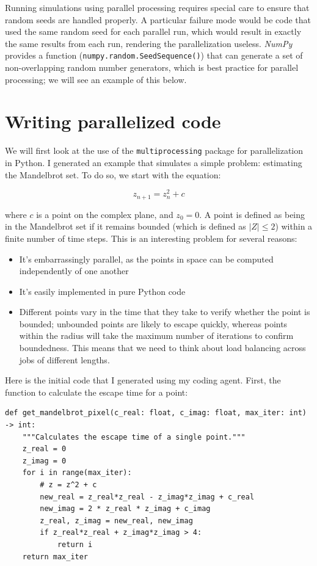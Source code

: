 Running simulations using parallel processing requires special care to ensure that random seeds are handled properly.  A particular failure mode would be code that used the same random seed for each parallel run, which would result in exactly the same results from each run, rendering the parallelization useless.  \textit{NumPy} provides a function (\texttt{numpy.random.SeedSequence()}) that can generate a set of non-overlapping random number generators, which is best practice for parallel processing; we will see an example of this below.

\section{Writing parallelized code}

We will first look at the use of the \texttt{multiprocessing} package for parallelization in Python.  I generated an example that simulates a simple problem: estimating the Mandelbrot set.  To do so, we start with the equation:

\begin{equation}
z_{n+1} = z^2_n + c
\end{equation}

where $c$ is a point on the complex plane, and $z_0 = 0$.  A point is defined as being in the Mandelbrot set if it remains bounded (which is defined as $|Z| \le 2$) within a finite number of time steps.  This is an interesting problem for several reasons:

\begin{itemize}
\item It's embarrassingly parallel, as the points in space can be computed independently of one another
\item It's easily implemented in pure Python code
\item Different points vary in the time that they take to verify whether the point is bounded; unbounded points are likely to escape quickly, whereas points within the radius will take the maximum number of iterations to confirm boundedness.  This means that we need to think about load balancing across jobs of different lengths.
\end{itemize}

Here is the initial code that I generated using my coding agent.  First, the function to calculate the escape time for a point:

\begin{lstlisting}[style=Python]
def get_mandelbrot_pixel(c_real: float, c_imag: float, max_iter: int) -> int:
    """Calculates the escape time of a single point."""
    z_real = 0
    z_imag = 0
    for i in range(max_iter):
        # z = z^2 + c
        new_real = z_real*z_real - z_imag*z_imag + c_real
        new_imag = 2 * z_real * z_imag + c_imag
        z_real, z_imag = new_real, new_imag
        if z_real*z_real + z_imag*z_imag > 4:
            return i
    return max_iter
\end{lstlisting}

